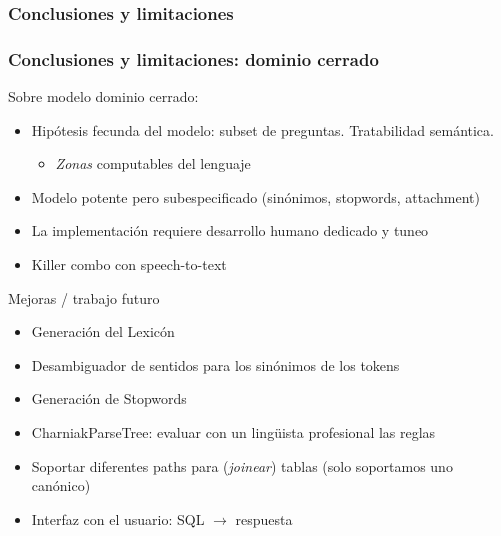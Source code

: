 

\subsubsection*{Conclusiones y limitaciones}

\begin{frame}\fontsize{9.0pt}{9.0}\selectfont
\frametitle{Conclusiones y limitaciones: dominio cerrado}

Sobre modelo dominio cerrado:
\begin{itemize}
  \item Hipótesis fecunda del modelo: subset de preguntas. Tratabilidad semántica.
  \begin{itemize}
    \item \textit{Zonas} computables del lenguaje
  \end{itemize}
  \item Modelo potente pero subespecificado (sinónimos, stopwords, attachment)
  \item La implementación requiere desarrollo humano dedicado y tuneo
  \item Killer combo con speech-to-text
  \end{itemize}

\medskip
Mejoras / trabajo futuro
\begin{itemize}
\item Generación del Lexicón
\item Desambiguador de sentidos para los sinónimos de los tokens
\item Generación de Stopwords
\item CharniakParseTree: evaluar con un lingüista profesional las reglas
\item Soportar diferentes paths para (\textit{joinear}) tablas (solo soportamos uno canónico)
\item Interfaz con el usuario: SQL $\rightarrow$ respuesta

\end{itemize}
\end{frame}
